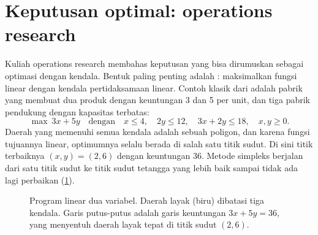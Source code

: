 \section{Keputusan optimal: operations research}

Kuliah operations research membahas keputusan yang bisa dirumuskan sebagai optimasi dengan
kendala. Bentuk paling penting adalah : maksimalkan fungsi linear dengan
kendala pertidaksamaan linear. Contoh klasik dari \citet{hillier2015} adalah pabrik yang membuat dua
produk dengan keuntungan 3 dan 5 per unit, dan tiga pabrik pendukung dengan kapasitas terbatas:
\begin{equation}
\max\ 3x+5y\quad\text{dengan}\quad x\le4,\quad 2y\le12,\quad 3x+2y\le18,\quad x,y\ge0.
\end{equation}
Daerah yang memenuhi semua kendala adalah sebuah poligon, dan karena fungsi tujuannya linear,
optimumnya selalu berada di salah satu titik sudut. Di sini titik terbaiknya $(x,y)=(2,6)$ dengan
keuntungan 36. Metode simpleks berjalan dari satu titik sudut ke titik sudut tetangga yang lebih
baik sampai tidak ada lagi perbaikan (\cref{fig:lp}).

\begin{figure}[ht]
\centering
{}
\caption{Program linear dua variabel. Daerah layak (biru) dibatasi tiga kendala. Garis putus-putus adalah garis
keuntungan $3x+5y=36$, yang menyentuh daerah layak tepat di titik sudut $(2,6)$.}
\label{fig:lp}
\end{figure}

